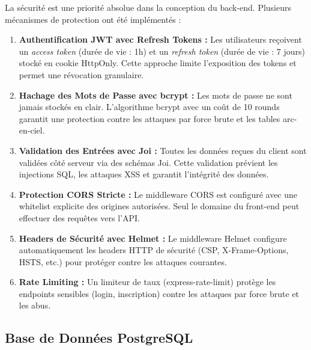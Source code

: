 \documentclass[12pt,a4paper,twoside,openright]{report}
\begin{document}
La sécurité est une priorité absolue dans la conception du back-end. Plusieurs mécanismes de protection ont été implémentés :

\begin{enumerate}[label=\textcolor{primaryBlue}{\textbf{\arabic*.}}, leftmargin=1.5cm, itemsep=0.4cm]

    \item \textbf{Authentification JWT avec Refresh Tokens :}
    Les utilisateurs reçoivent un \textit{access token} (durée de vie : 1h) et un \textit{refresh token} (durée de vie : 7 jours) stocké en cookie HttpOnly. Cette approche limite l'exposition des tokens et permet une révocation granulaire.

    \item \textbf{Hachage des Mots de Passe avec bcrypt :}
    Les mots de passe ne sont jamais stockés en clair. L'algorithme bcrypt avec un coût de 10 rounds garantit une protection contre les attaques par force brute et les tables arc-en-ciel.

    \item \textbf{Validation des Entrées avec Joi :}
    Toutes les données reçues du client sont validées côté serveur via des schémas Joi. Cette validation prévient les injections SQL, les attaques XSS et garantit l'intégrité des données.

    \item \textbf{Protection CORS Stricte :}
    Le middleware CORS est configuré avec une whitelist explicite des origines autorisées. Seul le domaine du front-end peut effectuer des requêtes vers l'API.

    \item \textbf{Headers de Sécurité avec Helmet :}
    Le middleware Helmet configure automatiquement les headers HTTP de sécurité (CSP, X-Frame-Options, HSTS, etc.) pour protéger contre les attaques courantes.

    \item \textbf{Rate Limiting :}
    Un limiteur de taux (express-rate-limit) protège les endpoints sensibles (login, inscription) contre les attaques par force brute et les abus.

\end{enumerate}

\vspace{0.5cm}

\subsection{Base de Données PostgreSQL}
\end{document}
